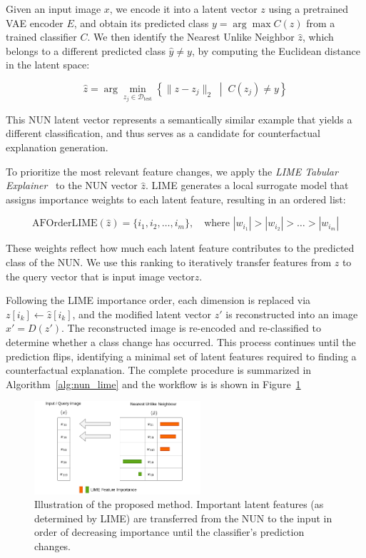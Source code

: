 Given an input image \( x \), we encode it into a latent vector \( z \) using a pretrained VAE encoder \( E \), and obtain its predicted class \( y = \arg\max C(z) \) from a trained classifier \( C \). We then identify the Nearest Unlike Neighbor \( \hat{z} \), which belongs to a different predicted class \( \hat{y} \ne y \), by computing the Euclidean distance in the latent space:

\[
\hat{z} = \arg\min_{z_j \in \mathcal{D}_{\text{test}}} \left\{ \| z - z_j \|_2 \; \middle| \; C(z_j) \ne y \right\}
\]

This NUN latent vector represents a semantically similar example that yields a different classification, and thus serves as a candidate for counterfactual explanation generation.

To prioritize the most relevant feature changes, we apply the \textit{LIME Tabular Explainer}~\cite{Ribeiro2018} to the NUN vector \( \hat{z} \). LIME generates a local surrogate model that assigns importance weights to each latent feature, resulting in an ordered list:

\[
\text{AFOrderLIME}(\hat{z}) = \{ i_1, i_2, \dots, i_m \}, \quad \text{where } |w_{i_1}| > |w_{i_2}| > \dots > |w_{i_m}|
\]

These weights reflect how much each latent feature contributes to the predicted class of the NUN. We use this ranking to iteratively transfer features from \( \hat{z} \) to the query vector that is input image vector\( z \).

Following the LIME importance order, each dimension is replaced via \( z[i_k] \leftarrow \hat{z}[i_k] \), and the modified latent vector \( z' \) is reconstructed into an image \( x' = D(z') \). The reconstructed image is re-encoded and re-classified to determine whether a class change has occurred. This process continues until the prediction flips, identifying a minimal set of latent features required to finding a counterfactual explanation. The complete procedure is summarized in Algorithm~\ref{alg:nun_lime} and the workflow is is shown in Figure~\ref{fig:nun_lime}

\begin{figure}[htbp]
    \centering
    \includegraphics[width=0.55\textwidth]{img/masking/lime_on_latent_nun/NUN_method.drawio.png}
    \caption{Illustration of the proposed method. Important latent features (as determined by LIME) are transferred from the NUN to the input in order of decreasing importance until the classifier's prediction changes.}
    \label{fig:nun_lime}
\end{figure}


